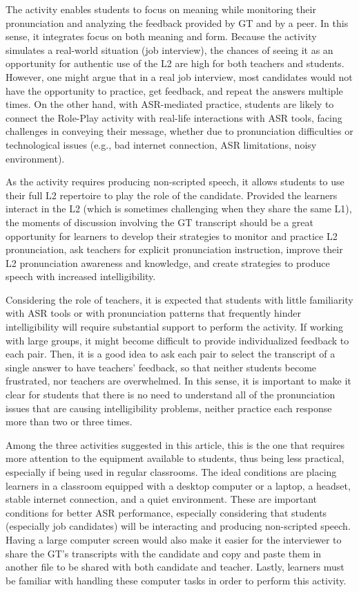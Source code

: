 \documentclass[english]{textolivre}
\begin{document}
The activity enables students to focus on meaning while monitoring their
pronunciation and analyzing the feedback provided by GT and by a peer.
In this sense, it integrates focus on both meaning and form. Because the
activity simulates a real-world situation (job interview), the chances
of seeing it as an opportunity for authentic use of the L2 are high for
both teachers and students. However, one might argue that in a real job
interview, most candidates would not have the opportunity to practice,
get feedback, and repeat the answers multiple times. On the other hand,
with ASR-mediated practice, students are likely to connect the Role-Play
activity with real-life interactions with ASR tools, facing challenges
in conveying their message, whether due to pronunciation difficulties or
technological issues (e.g., bad internet connection, ASR limitations,
noisy environment).

As the activity requires producing non-scripted speech, it allows
students to use their full L2 repertoire to play the role of the
candidate. Provided the learners interact in the L2 (which is sometimes
challenging when they share the same L1), the moments of discussion
involving the GT transcript should be a great opportunity for learners
to develop their strategies to monitor and practice L2 pronunciation,
ask teachers for explicit pronunciation instruction, improve their L2
pronunciation awareness and knowledge, and create strategies to produce
speech with increased intelligibility.

Considering the role of teachers, it is expected that students with
little familiarity with ASR tools or with pronunciation patterns that
frequently hinder intelligibility will require substantial support to
perform the activity. If working with large groups, it might become
difficult to provide individualized feedback to each pair. Then, it is a
good idea to ask each pair to select the transcript of a single answer
to have teachers' feedback, so that neither students become frustrated,
nor teachers are overwhelmed. In this sense, it is important to make it
clear for students that there is no need to understand all of the
pronunciation issues that are causing intelligibility problems, neither
practice each response more than two or three times.

Among the three activities suggested in this article, this is the one
that requires more attention to the equipment available to students,
thus being less practical, especially if being used in regular
classrooms. The ideal conditions are placing learners in a classroom
equipped with a desktop computer or a laptop, a headset, stable internet
connection, and a quiet environment. These are important conditions for
better ASR performance, especially considering that students (especially
job candidates) will be interacting and producing non-scripted speech.
Having a large computer screen would also make it easier for the
interviewer to share the GT's transcripts with the candidate and copy
and paste them in another file to be shared with both candidate and
teacher. Lastly, learners must be familiar with handling these computer
tasks in order to perform this activity.
\end{document}
